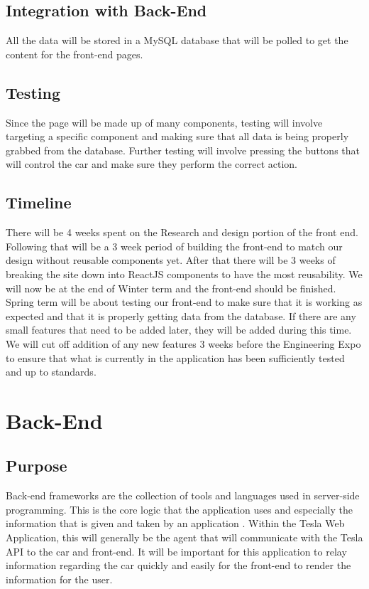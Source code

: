 \documentclass[onecolumn, draftclsnofoot,10pt, compsoc]{IEEEtran}
\begin{document}
    \subsection{Integration with Back-End}
        All the data will be stored in a MySQL database that will be polled to get the content for the front-end pages.
    \subsection{Testing}
        Since the page will be made up of many components, testing will involve targeting a specific component and making sure that all data is being properly grabbed from the database. Further testing will involve pressing the buttons that will control the car and make sure they perform the correct action.
    \subsection{Timeline}
        There will be 4 weeks spent on the Research and design portion of the front end.
        Following that will be a 3 week period of building the front-end to match our design without reusable components yet.
        After that there will be 3 weeks of breaking the site down into ReactJS components to have the most reusability.
        We will now be at the end of Winter term and the front-end should be finished.
        Spring term will be about testing our front-end to make sure that it is working as expected and that it is properly getting data from the database.
        If there are any small features that need to be added later, they will be added during this time.
        We will cut off addition of any new features 3 weeks before the Engineering Expo to ensure that what is currently in the application has been sufficiently tested and up to standards.

\section{Back-End}
    \subsection{Purpose}
        Back-end frameworks are the collection of tools and languages used in server-side programming. This is the core logic that the application uses and especially the information that is given and taken by an application \cite{tripathi_2018}. Within the Tesla Web Application, this will generally be the agent that will communicate with the Tesla API to the car and front-end. It will be important for this application to relay information regarding the car quickly and easily for the front-end to render the information for the user. 
\end{document}

